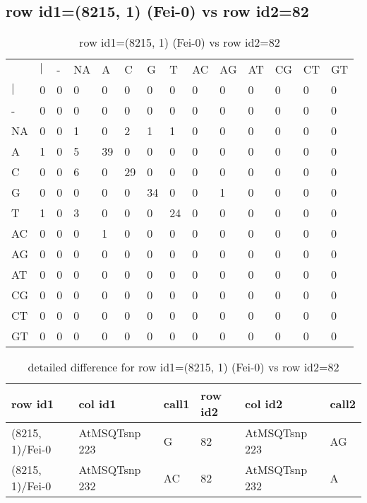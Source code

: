 \subsection{row id1=(8215, 1) (Fei-0) vs row id2=82}
\begin{center}
\begin{longtable}{|l|l|l|l|l|l|l|l|l|l|l|l|l|l|}
\caption{row id1=(8215, 1) (Fei-0) vs row id2=82} \label{table_dm346}\\
\hline
\\
\hline
&$|$&-&NA&A&C&G&T&AC&AG&AT&CG&CT&GT\\
$|$&0&0&0&0&0&0&0&0&0&0&0&0&0\\
-&0&0&0&0&0&0&0&0&0&0&0&0&0\\
NA&0&0&1&0&2&1&1&0&0&0&0&0&0\\
A&1&0&5&39&0&0&0&0&0&0&0&0&0\\
C&0&0&6&0&29&0&0&0&0&0&0&0&0\\
G&0&0&0&0&0&34&0&0&1&0&0&0&0\\
T&1&0&3&0&0&0&24&0&0&0&0&0&0\\
AC&0&0&0&1&0&0&0&0&0&0&0&0&0\\
AG&0&0&0&0&0&0&0&0&0&0&0&0&0\\
AT&0&0&0&0&0&0&0&0&0&0&0&0&0\\
CG&0&0&0&0&0&0&0&0&0&0&0&0&0\\
CT&0&0&0&0&0&0&0&0&0&0&0&0&0\\
GT&0&0&0&0&0&0&0&0&0&0&0&0&0\\
\hline
\end{longtable}
\end{center}

\begin{center}
\begin{longtable}{|l|l|l|l|l|l|}
\caption{detailed difference for row id1=(8215, 1) (Fei-0) vs row id2=82} \label{table_dm347}\\
\hline
row id1&col id1&call1&row id2&col id2&call2\\
\hline
(8215, 1)/Fei-0&AtMSQTsnp 223&G&82&AtMSQTsnp 223&AG\\
(8215, 1)/Fei-0&AtMSQTsnp 232&AC&82&AtMSQTsnp 232&A\\
\hline
\end{longtable}
\end{center}

